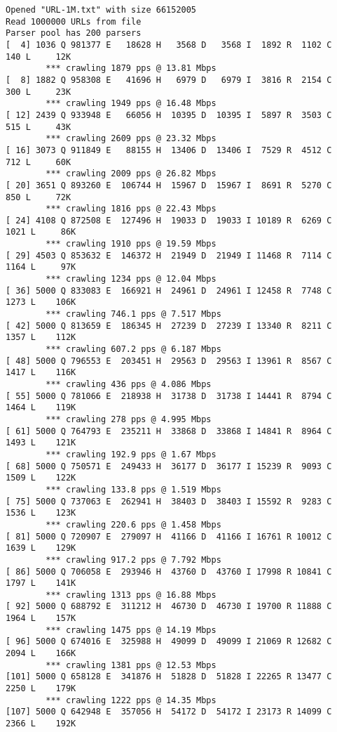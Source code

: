 \documentclass[11pt]{article}
\begin{document}
\begin{lstlisting}[label=app-trace,caption=Output of Homework 1]
Opened "URL-1M.txt" with size 66152005
Read 1000000 URLs from file
Parser pool has 200 parsers
[  4] 1036 Q 981377 E   18628 H   3568 D   3568 I  1892 R  1102 C   140 L     12K
        *** crawling 1879 pps @ 13.81 Mbps
[  8] 1882 Q 958308 E   41696 H   6979 D   6979 I  3816 R  2154 C   300 L     23K
        *** crawling 1949 pps @ 16.48 Mbps
[ 12] 2439 Q 933948 E   66056 H  10395 D  10395 I  5897 R  3503 C   515 L     43K
        *** crawling 2609 pps @ 23.32 Mbps
[ 16] 3073 Q 911849 E   88155 H  13406 D  13406 I  7529 R  4512 C   712 L     60K
        *** crawling 2009 pps @ 26.82 Mbps
[ 20] 3651 Q 893260 E  106744 H  15967 D  15967 I  8691 R  5270 C   850 L     72K
        *** crawling 1816 pps @ 22.43 Mbps
[ 24] 4108 Q 872508 E  127496 H  19033 D  19033 I 10189 R  6269 C  1021 L     86K
        *** crawling 1910 pps @ 19.59 Mbps
[ 29] 4503 Q 853632 E  146372 H  21949 D  21949 I 11468 R  7114 C  1164 L     97K
        *** crawling 1234 pps @ 12.04 Mbps
[ 36] 5000 Q 833083 E  166921 H  24961 D  24961 I 12458 R  7748 C  1273 L    106K
        *** crawling 746.1 pps @ 7.517 Mbps
[ 42] 5000 Q 813659 E  186345 H  27239 D  27239 I 13340 R  8211 C  1357 L    112K
        *** crawling 607.2 pps @ 6.187 Mbps
[ 48] 5000 Q 796553 E  203451 H  29563 D  29563 I 13961 R  8567 C  1417 L    116K
        *** crawling 436 pps @ 4.086 Mbps
[ 55] 5000 Q 781066 E  218938 H  31738 D  31738 I 14441 R  8794 C  1464 L    119K
        *** crawling 278 pps @ 4.995 Mbps
[ 61] 5000 Q 764793 E  235211 H  33868 D  33868 I 14841 R  8964 C  1493 L    121K
        *** crawling 192.9 pps @ 1.67 Mbps
[ 68] 5000 Q 750571 E  249433 H  36177 D  36177 I 15239 R  9093 C  1509 L    122K
        *** crawling 133.8 pps @ 1.519 Mbps
[ 75] 5000 Q 737063 E  262941 H  38403 D  38403 I 15592 R  9283 C  1536 L    123K
        *** crawling 220.6 pps @ 1.458 Mbps
[ 81] 5000 Q 720907 E  279097 H  41166 D  41166 I 16761 R 10012 C  1639 L    129K
        *** crawling 917.2 pps @ 7.792 Mbps
[ 86] 5000 Q 706058 E  293946 H  43760 D  43760 I 17998 R 10841 C  1797 L    141K
        *** crawling 1313 pps @ 16.88 Mbps
[ 92] 5000 Q 688792 E  311212 H  46730 D  46730 I 19700 R 11888 C  1964 L    157K
        *** crawling 1475 pps @ 14.19 Mbps
[ 96] 5000 Q 674016 E  325988 H  49099 D  49099 I 21069 R 12682 C  2094 L    166K
        *** crawling 1381 pps @ 12.53 Mbps
[101] 5000 Q 658128 E  341876 H  51828 D  51828 I 22265 R 13477 C  2250 L    179K
        *** crawling 1222 pps @ 14.35 Mbps
[107] 5000 Q 642948 E  357056 H  54172 D  54172 I 23173 R 14099 C  2366 L    192K

\end{lstlisting}
\end{document}

